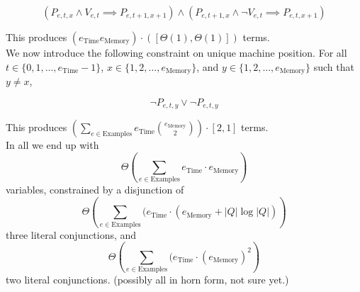 \documentclass[12pt]{article}
\begin{document}
$$(P_{e,t,x}\land V_{e,t}\implies P_{e,t+1,x+1})\land(P_{e,t+1,x}\land \lnot V_{e,t}\implies P_{e,t,x+1})$$

This produces $(e_\text{Time}e_\text{Memory})\cdot([\Theta(1),\Theta(1)])$ terms.\\



We now introduce the following constraint on unique machine position. For all $t\in\{0,1,\dots,e_\text{Time}-1\}$, $x\in\{1,2,\dots,e_\text{Memory}\}$, and $y\in\{1,2,\dots,e_\text{Memory}\}$ such that $y \not= x$,

$$\lnot P_{e,t,y} \lor \lnot P_{e,t,y}$$

This produces $(\sum_{e\in \text{Examples}} e_\text{Time}\binom{e_\text{Memory}}{2})\cdot[2,1]$ terms.\\


In all we end up with $$\Theta\left(\sum_{e\in \text{Examples}} e_\text{Time}\cdot e_\text{Memory}\right)$$ variables, constrained by a disjunction of $$\Theta\left(\sum_{e\in \text{Examples}} (e_\text{Time}\cdot\left(e_\text{Memory}+|Q| \log |Q|\right)\right)$$ three literal conjunctions, and $$\Theta\left(\sum_{e\in \text{Examples}} (e_\text{Time}\cdot (e_\text{Memory})^2\right)$$ two literal conjunctions. (possibly all in horn form, not sure yet.)
\end{document}
